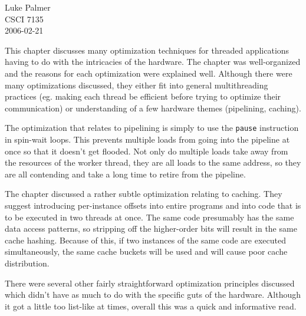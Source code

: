 \documentclass[12pt]{article}
\begin{document}
\noindent
Luke Palmer \\
CSCI 7135 \\
2006-02-21

This chapter discusses many optimization techniques for threaded
applications having to do with the intricacies of the hardware.  The
chapter was well-organized and the reasons for each optimization were
explained well.  Although there were many optimizations discussed, they
either fit into general multithreading practices (eg. making each thread
be efficient before trying to optimize their communication) or
understanding of a few hardware themes (pipelining, caching).

The optimization that relates to pipelining is simply to use the
\texttt{pause} instruction in spin-wait loops.  This prevents multiple
loads from going into the pipeline at once so that it doesn't get
flooded.  Not only do multiple loads take away from the resources of the
worker thread, they are all loads to the same address, so they are all
contending and take a long time to retire from the pipeline.

The chapter discussed a rather subtle optimization relating to caching.
They suggest introducing per-instance offsets into entire programs and
into code that is to be executed in two threads at once.  The same code
presumably has the same data access patterns, so stripping off the
higher-order bits will result in the same cache hashing.  Because of
this, if two instances of the same code are executed simultaneously, the
same cache buckets will be used and will cause poor cache distribution.

There were several other fairly straightforward optimization principles
discussed which didn't have as much to do with the specific guts of the
hardware.  Although it got a little too list-like at times, overall this
was a quick and informative read.
\end{document}
